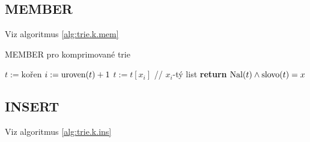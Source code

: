 \subsection{MEMBER}

Viz algoritmus \ref{alg:trie.k.mem}

\begin{algorithm}[!htb]
\caption{MEMBER pro komprimované trie}
\label{alg:trie.k.mem}
\begin{algorithmic}
\STATE {}
\STATE $t := \text{kořen}$
        \STATE $i := \textrm{uroven}(t) + 1$
        \STATE $t := t[x_i]$ // $x_i$-tý list
\ENDWHILE
\STATE {}
\STATE \textbf{return} $\textrm{Nal}(t) \land \textrm{slovo}(t) = x$
\end{algorithmic}
\end{algorithm}


\subsection{INSERT}

Viz algoritmus \ref{alg:trie.k.ins}

